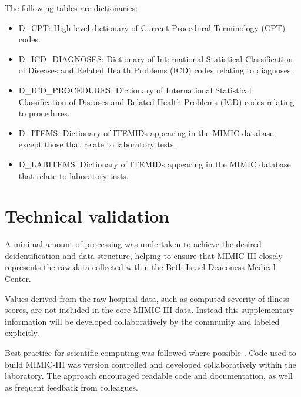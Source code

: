 \documentclass[english]{article}
\begin{document}
The following tables are dictionaries:

\begin{itemize}
  \item D\_CPT: High level dictionary of Current Procedural Terminology (CPT) codes.
  \item D\_ICD\_DIAGNOSES: Dictionary of International Statistical Classification of Diseases and Related Health Problems (ICD) codes relating to diagnoses.
  \item D\_ICD\_PROCEDURES: Dictionary of International Statistical Classification of Diseases and Related Health Problems (ICD) codes relating to procedures.
  \item D\_ITEMS: Dictionary of ITEMIDs appearing in the MIMIC database, except those that relate to laboratory tests.
  \item D\_LABITEMS: Dictionary of ITEMIDs appearing in the MIMIC database that relate to laboratory tests.
\end{itemize}


\section*{Technical validation}


A minimal amount of processing was undertaken to achieve the desired deidentification and data structure, helping to ensure that MIMIC-III closely represents the raw data collected within the Beth Israel Deaconess Medical Center.

Values derived from the raw hospital data, such as computed severity of illness scores, are not included in the core MIMIC-III data. Instead this supplementary information will be developed collaboratively by the community and labeled explicitly.

Best practice for scientific computing was followed where possible \cite{cite4}. Code used to build MIMIC-III was version controlled and developed collaboratively within the laboratory. The approach encouraged readable code and documentation, as well as frequent feedback from colleagues.
\end{document}
